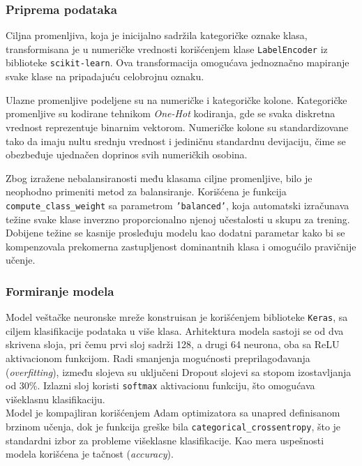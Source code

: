 \documentclass[a4paper,12pt]{article}
\begin{document}
\subsubsection*{Priprema podataka}
Ciljna promenljiva, koja je inicijalno sadržila kategoričke oznake klasa, transformisana je u numeričke vrednosti korišćenjem klase \texttt{LabelEncoder} iz biblioteke \texttt{scikit-learn}. Ova transformacija omogućava jednoznačno mapiranje svake klase na pripadajuću celobrojnu oznaku.

Ulazne promenljive podeljene su na numeričke i kategoričke kolone. Kategoričke promenljive su kodirane tehnikom \textit{One-Hot} kodiranja, gde se svaka diskretna vrednost reprezentuje binarnim vektorom. Numeričke kolone su standardizovane tako da imaju nultu srednju vrednost i jediničnu standardnu devijaciju, čime se obezbeđuje ujednačen doprinos svih numeričkih osobina.

Zbog izražene nebalansiranosti među klasama ciljne promenljive, bilo je neophodno primeniti metod za balansiranje. Korišćena je funkcija \\ \texttt{compute\_class\_weight} sa parametrom \texttt{'balanced'}, koja automatski izračunava težine svake klase inverzno proporcionalno njenoj učestalosti u skupu za trening. Dobijene težine se kasnije prosleđuju modelu kao dodatni parametar kako bi se kompenzovala prekomerna zastupljenost dominantnih klasa i omogućilo pravičnije učenje.

\subsubsection*{Formiranje modela}

Model veštačke neuronske mreže konstruisan je korišćenjem biblioteke \texttt{Keras}, sa ciljem klasifikacije podataka u više klasa. Arhitektura modela sastoji se od dva skrivena sloja, pri čemu prvi sloj sadrži 128, a drugi 64 neurona, oba sa ReLU aktivacionom funkcijom. Radi smanjenja mogućnosti preprilagođavanja (\textit{overfitting}), između slojeva su uključeni Dropout slojevi sa stopom izostavljanja od 30\%. Izlazni sloj koristi \texttt{softmax} aktivacionu funkciju, što omogućava višeklasnu klasifikaciju.
\\
Model je kompajliran korišćenjem Adam optimizatora sa unapred definisanom brzinom učenja, dok je funkcija greške bila \texttt{categorical\_crossentropy}, što je standardni izbor za probleme višeklasne klasifikacije. Kao mera uspešnosti modela korišćena je tačnost (\textit{accuracy}).
\end{document}
